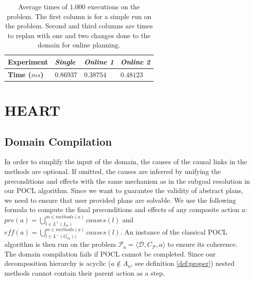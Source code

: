 \documentclass[11pt,a4paper,twoside,openright,titlepage,numbers=noenddot,headinclude,cleardoublepage=empty,openany]{scrreprt}
\theoremstyle{plain}
\theoremstyle{definition}
\theoremstyle{remark}
\begin{document}
\hypertarget{tbl:results}{}
\begin{table}\footnotesize
\centering

\caption{\label{tbl:results}Average times of \(1.000\) executions on the
problem. The first column is for a simple run on the problem. Second and
third columns are times to replan with one and two changes done to the
domain for online planning.}

\begin{tabular}{@{}llll@{}}
\toprule

\textbf{Experiment} & \emph{Single} & \emph{Online 1} & \emph{Online
2} \\\midrule

\textbf{Time (\(ms\))} & \(0.86937\) & \(0.38754\) & \(0.48123\) \\

\bottomrule
\end{tabular}

\end{table}

\hypertarget{heart}{%
\section{HEART}\label{heart}}

\hypertarget{domain-compilation}{%
\subsection{Domain Compilation}\label{domain-compilation}}

In order to simplify the input of the domain, the causes of the causal
links in the methods are optional. If omitted, the causes are inferred
by unifying the preconditions and effects with the same mechanism as in
the subgoal resolution in our POCL algorithm. Since we want to guarantee
the validity of abstract plans, we need to ensure that user provided
plans are solvable. We use the following formula to compute the final
preconditions and effects of any composite action \(a\):
\(\mathit{pre}(a) = \bigcup_{l \in L^+(I_m)}^{m \in methods(a)} \mathit{causes}(l)\)
and
\(\mathit{eff}(a) = \bigcup_{l \in L^-(G_m))}^{m \in methods(a)} \mathit{causes}(l)\).
An instance of the classical POCL algorithm is then run on the problem
\(\mathcal{P}_a = \langle \mathcal{D}, C_{\mathcal{P}} , a\rangle\) to
ensure its coherence. The domain compilation fails if POCL cannot be
completed. Since our decomposition hierarchy is acyclic
(\(a \notin A_a\), see definition \ref{def:proper}) nested methods
cannot contain their parent action as a step.
\end{document}
